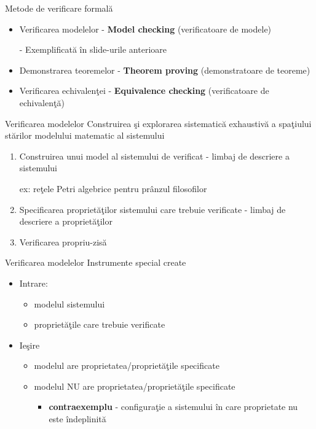 \documentclass{beamer}
\begin{document}
\begin{frame}{Metode de verificare formală}
\begin{itemize}
\item
Verificarea modelelor - \textbf{Model checking}
(verificatoare de modele)

- Exemplificată în slide-urile anterioare
\item
Demonstrarea teoremelor - \textbf{Theorem proving}
(demonstratoare de teoreme)
\item
Verificarea echivalenţei - \textbf{Equivalence checking}
(verificatoare de echivalenţă)
\end{itemize}
\end{frame}



\begin{frame}{Verificarea modelelor}
Construirea şi explorarea sistematică exhaustivă a spaţiului stărilor modelului matematic al sistemului

\vspace{0.5cm}

\begin{enumerate}
\item
Construirea unui model al sistemului de verificat
- limbaj de descriere a sistemului

ex: reţele Petri algebrice pentru prânzul filosofilor
\item
Specificarea proprietăţilor sistemului care trebuie verificate
- limbaj de descriere a proprietăţilor

\item
Verificarea propriu-zisă
\end{enumerate}
\end{frame}



\begin{frame}{Verificarea modelelor}
Instrumente special create
\begin{itemize}
\item
Intrare: 
\begin{itemize}
\item
modelul sistemului
\item
proprietăţile care trebuie verificate
\end{itemize}
\item
Ieşire
\begin{itemize}
\item
modelul are proprietatea/proprietăţile specificate
\item
modelul NU are proprietatea/proprietăţile specificate
\begin{itemize}
\item
\textbf{contraexemplu} - configuraţie a sistemului în care proprietate nu este îndeplinită
\end{itemize}
\end{itemize}
\end{itemize}
\end{frame}
\end{document}
